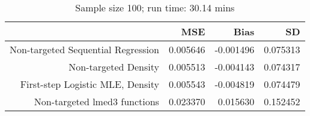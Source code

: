 \begin{table}[ht]
\centering
\caption{Sample size 100; run time: 30.14 mins} 
\begin{tabular}{rrrr}
  \hline
 & MSE & Bias & SD \\ 
  \hline
Non-targeted Sequential Regression & 0.005646 & -0.001496 & 0.075313 \\ 
  Non-targeted Density & 0.005513 & -0.004143 & 0.074317 \\ 
  First-step Logistic MLE, Density & 0.005543 & -0.004819 & 0.074479 \\ 
  Non-targeted lmed3 functions & 0.023370 & 0.015630 & 0.152452 \\ 
   \hline
\end{tabular}
\end{table}
